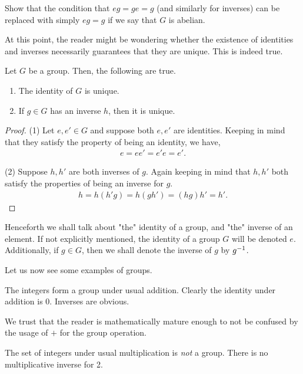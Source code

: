 \documentclass[./main.tex]{subfiles}
\begin{document}
\begin{exercise}
    Show that the condition that $eg=ge=g$ (and similarly for inverses) can be
    replaced with simply $eg=g$ if we say that $G$ is abelian.
\end{exercise}

At this point, the reader might be wondering whether the existence of identities
and inverses necessarily guarantees that they are unique. This is indeed true.
\begin{theorem}
\label{thm:group-identity-inverses-unique}
    Let $G$ be a group. Then, the following are true. 
    \begin{enumerate}
        \item The identity of $G$ is unique. 
        \item If $g \in G$ has an inverse $h$, then it is unique.
    \end{enumerate}
\end{theorem}
\begin{proof}
    (1) Let $e, e' \in G$ and suppose both $e, e'$ are identities. Keeping in
    mind that they satisfy the property of being an identity, we have, 
    \begin{align*}
        e = ee' = e'e = e'.
    \end{align*}

    (2) Suppose $h, h'$ are both inverses of $g$. Again keeping in mind that $h,
    h'$ both satisfy the properties of being an inverse for $g$.
    \begin{align*}
        h = h(h'g) = h(gh') = (hg)h' = h'.
    \end{align*}
\end{proof}
Henceforth we shall talk about "the" identity of a group, and "the" inverse of
an element. If not explicitly mentioned, the identity of a group $G$ will be
denoted $e$. Additionally, if $g \in G$, then we shall denote the inverse of $g$
by $g^{-1}$. 

Let us now see some examples of groups.
\begin{example}[Integers]
    The integers form a group under usual addition. Clearly the identity under
    addition is $0$. Inverses are obvious.
\end{example}
We trust that the reader is mathematically mature enough to not be confused by
the usage of $+$ for the group operation.

\begin{example}
    The set of integers under usual multiplication is \emph{not} a group. There is no
    multiplicative inverse for 2.
\end{example}
\end{document}
